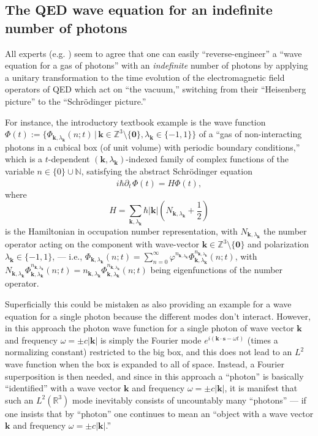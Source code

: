 \documentclass[11pt]{article}
\theoremstyle{definition}
\newcommand{\vect}[1] {\boldsymbol{{ #1}} }
\newcommand{\kV}{{\vect{k}}}		%
\newcommand{\sV}{{\vect{s}}}            %
\numberwithin{equation}{section}
\newcommand{\beq}{\begin{equation}}
\newcommand{\eeq}{\end{equation}}
\newcommand{\Nset}{{\mathbb N}}
\newcommand{\Rset}{{\mathbb R}}
\newcommand{\Zset}{{\mathbb Z}}
\newcommand{\pdt}{{\partial_t^{\phantom{0}}}}
\begin{document}
\subsection{The QED wave equation for an indefinite number of photons}

 All experts (e.g. \cite{OppiPHOTON,LandauLifshitzBOOKrelQM,WeinbergBOOKqft,IBBphotonREV,IBBZBBphotonREV, ScullyBOOK, Cohen-Tannoudji})
seem to agree that one can easily ``reverse-engineer'' a ``wave equation for a gas of photons''
with an \emph{indefinite} number of photons by applying a unitary transformation to the time evolution of the 
electromagnetic field operators of QED which act on ``the vacuum,'' switching from their ``Heisenberg picture'' 
to the ``Schr\"odinger picture.'' 

 For instance, the introductory textbook example is the wave function 
$\Phi(t) :=\{\Phi_{\kV,\lambda_\kV}(n;t)\,|\, \kV\in \Zset^3\!\setminus\!\{\boldsymbol{0}\},\lambda_\kV\in\{-1,1\}\}$ of  a 
``gas of non-interacting photons in a cubical box (of unit volume) with periodic boundary conditions,'' 
which is a $t$-dependent $(\kV,\lambda_\kV)$-indexed family of complex functions of the variable $n\in\{0\}\cup\Nset$,
satisfying the abstract Schr\"odinger equation
\beq \label{photonWEQUforINDEFINITELYmanyPHOTONS}
i\hbar \pdt \Phi(t) = H \Phi(t),
\eeq
where 
\beq \label{HforINDEFINITELYmanyPHOTONS}
H  = \sum_{\kV,\lambda_\kV} \hbar |\kV| ( N_{\kV,\lambda_\kV} + \textstyle\frac12) 
\eeq
is the Hamiltonian in occupation number representation, with $N_{\kV,\lambda_\kV}$ the number operator acting on
the component with wave-vector 
$\kV\in \Zset^3\!\setminus\!\{\boldsymbol{0}\}$ and polarization $\lambda_\kV\in\{-1,1\}$, 
--- i.e.,  
$\Phi_{\kV,\lambda_\kV}(n;t) =\sum_{n=0}^\infty \varphi^{n_{\kV,\lambda_\kV}}\Phi_{{\kV,\lambda_\kV}}^{n_{\kV,\lambda_\kV}}(n;t)$,
with $N_{\kV,\lambda_\kV}\Phi_{\kV,\lambda_\kV}^{n_{\kV,\lambda_\kV}}(n;t) = 
n_{\kV,\lambda_\kV}\Phi_{\kV,\lambda_\kV}^{n_{\kV,\lambda_\kV}}(n;t)$ being eigenfunctions of the number operator.

 Superficially this could be mistaken as also providing an example for a wave equation for a single photon because the different
modes don't interact. 
 However, in this approach the photon wave function for a single photon of wave vector $\kV$ and frequency $\omega = \pm c|\kV|$ is
simply the Fourier mode $e^{i(\kV\cdot\sV - \omega t)}$ (times a normalizing constant) restricted to the big box, and this
does not lead to an $L^2$ wave function when the box is expanded to  all of space. 
 Instead, a Fourier superposition is then needed, and since in this approach a ``photon'' is basically ``identified'' with a
wave vector $\kV$ and frequency $\omega = \pm c|\kV|$, it is manifest that such an $L^2(\Rset^3)$ mode inevitably consists of 
uncountably many ``photons'' --- if one insists that by ``photon'' one continues to mean an ``object with a 
wave vector $\kV$ and frequency $\omega = \pm c|\kV|$.''
\end{document}
